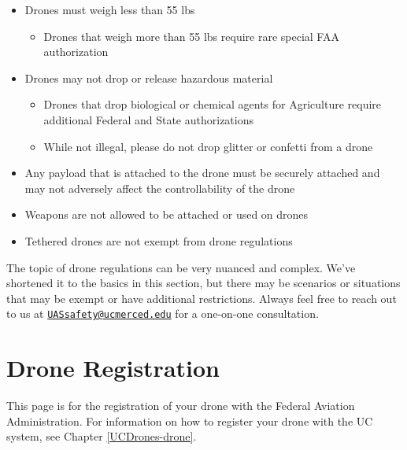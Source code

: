 \documentclass[
  12pt,
]{book}
\providecommand{\tightlist}{%
  \setlength{\itemsep}{0pt}\setlength{\parskip}{0pt}}
\newenvironment{notebox}{
  \definecolor{shadecolor}{gray}{.8}  %
  \color{black}
  \begin{shaded}}
 {\end{shaded}}
\begin{document}
\begin{itemize}
\tightlist
\item
  Drones must weigh less than 55 lbs

  \begin{itemize}
  \tightlist
  \item
    Drones that weigh more than 55 lbs require rare special FAA authorization
  \end{itemize}
\item
  Drones may not drop or release hazardous material

  \begin{itemize}
  \tightlist
  \item
    Drones that drop biological or chemical agents for Agriculture require additional Federal and State authorizations
  \item
    While not illegal, please do not drop glitter or confetti from a drone
  \end{itemize}
\item
  Any payload that is attached to the drone must be securely attached and may not adversely affect the controllability of the drone
\item
  Weapons are not allowed to be attached or used on drones
\item
  Tethered drones are not exempt from drone regulations
\end{itemize}

\begin{notebox}
The topic of drone regulations can be very nuanced and complex. We've shortened it to the basics in this section, but there may be scenarios or situations that may be exempt or have additional restrictions. Always feel free to reach out to us at \href{mailto:UASsafety@ucmerced.edu}{\nolinkurl{UASsafety@ucmerced.edu}} for a one-on-one consultation.

\end{notebox}

\hypertarget{registration}{%
\section{Drone Registration}\label{registration}}

\begin{notebox}
This page is for the registration of your drone with the Federal Aviation Administration. For information on how to register your drone with the UC system, see Chapter \ref{UCDrones-drone}.

\end{notebox}
\end{document}
